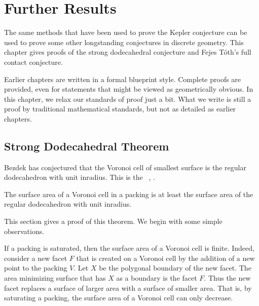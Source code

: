 
\chapter{Further Results}\label{sec:further}


The same methods that have been used to prove the Kepler conjecture
can be used to prove some other longstanding conjectures in discrete
geometry.  This chapter gives proofs of the strong dodecahedral
conjecture and Fejes T\'oth's full contact conjecture.

Earlier chapters are written in a formal blueprint style.
Complete proofs are provided, even for statements that might be
viewed as geometrically obvious.  In this chapter, we relax our
standards of proof just a bit.  What we write is still a proof by
traditional mathematical standards, but not as detailed as earlier
chapters.

\section{Strong Dodecahedral Theorem}

Bezdek has conjectured that the Voronoi cell of smallest surface is
the regular dodecahedron with unit inradius.  This is the
~\cite{Bezdek00}, \cite{Bezdek05}.  
%
%
%


\begin{theorem}
  The surface area of a Voronoi cell in a packing is at least the
  surface area of the regular dodecahedron with unit inradius.
\end{theorem}
%


This section gives a proof of this theorem.  We
begin with some simple observations.

\begin{remark}
  If a packing is  saturated, then the surface area of a Voronoi
  cell is finite.  
  Indeed, consider a new facet $F$ that is created on a Voronoi cell
  by the addition of a new point to the packing $V$.  Let $X$ be the
  polygonal boundary of the new facet.  The area minimizing surface
  that has $X$ as a boundary is the facet $F$.  Thus the new facet
  replaces a surface of larger area with a surface of smaller area.
  That is, by saturating a packing, the surface area of a Voronoi cell
  can only decrease.
\end{remark}

